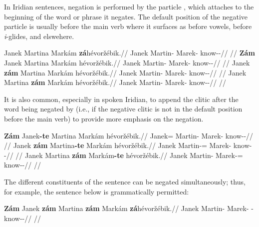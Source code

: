 In Iridian sentences, negation is performed by the particle , which attaches to the beginning of the word or phrase  it negates. The default position of the negative particle is usually before the main verb where it surfaces as  before vowels,  before \emph{i}-glides, and  elswehere.

\pex
\a
\begingl
    \gla Janek Martina Markám \textbf{zá}hévoržébik.//
    \glb Janek Martin-\Pat{} Marek-\Agt{} \Neg{}know-\Ben{}-\Pf{}//
    \glft {}//
\endgl
\a
\begingl
    \gla \textbf{Zám} Janek Martina Markám hévoržébik.//
    \glb \Neg{} Janek Martin-\Pat{} Marek-\Agt{} know-\Ben{}-\Pf{}//
    \glft {}//
\endgl
\a
\begingl
    \gla Janek \textbf{zám} Martina Markám hévoržébik.//
    \glb Janek \Neg{} Martin-\Pat{} Marek-\Agt{} know-\Ben{}-\Pf{}//
    \glft {}//
\endgl
\a
\begingl
    \gla Janek Martina \textbf{zám} Markám hévoržébik.//
    \glb Janek Martin-\Pat{} \Neg{} Marek-\Agt{} know-\Ben{}-\Pf{}//
    \glft {}//
\endgl
\xe

It is also common, especially in spoken Iridian, to append the clitic 
after the word being negated by  (i.e., if the negative clitic is not
in the default position before the main verb) to provide more emphasis on the
negation.

\pex
\a
\begingl
    \gla \textbf{Zám} Janek\textbf{-te} Martina Markám hévoržébik.//
    \glb \Neg{} Janek=\Foc{} Martin-\Pat{} Marek-\Agt{} know-\Ben{}-\Pf{}//
    \glft {}//
\endgl
\a
\begingl
    \gla Janek \textbf{zám} Martina\textbf{-te} Markám hévoržébik.//
    \glb Janek \Neg{} Martin-\Pat{}=\Foc{} Marek-\Agt{} know-\Ben{}-\Pf{}//
    \glft {}//
\endgl
\a
\begingl
    \gla Janek Martina \textbf{zám} Markám\textbf{-te} hévoržébik.//
    \glb Janek Martin-\Pat{} \Neg{} Marek-\Agt{}=\Foc{} know-\Ben{}-\Pf{}//
    \glft {}//
\endgl
\xe

The different constituents of the sentence can be negated simultaneously; thus,
for example, the sentence below is grammatically permitted:

\pex
\begingl
    \gla \textbf{Zám} Janek \textbf{zám} Martina \textbf{zám} Markám \textbf{zá}hévoržébik.//
    \glb \Neg{} Janek \Neg{} Martin-\Pat{} \Neg{} Marek-\Agt{} \Neg{}-know-\Ben{}-\Pf{}//
    \glft {}//
\endgl
\xe

